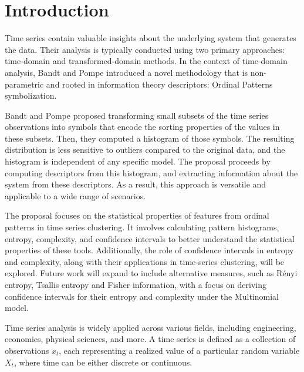 \chapter{Introduction}\label{C:intro}

Time series contain valuable insights about the underlying system that generates the data. 
Their analysis is typically conducted using two primary approaches: time-domain and transformed-domain methods. 
In the context of time-domain analysis, Bandt and Pompe \cite{PhysRevLett.88.174102} introduced a novel methodology that is non-parametric and rooted in information theory descriptors: Ordinal Patterns symbolization. 

Bandt and Pompe \cite{PhysRevLett.88.174102} proposed transforming small subsets of the time series observations into symbols that encode the sorting properties of the values in these subsets.
Then, they computed a histogram of those symbols.
The resulting distribution is less sensitive to outliers compared to the original data, and the histogram is independent of any specific model.
The proposal proceeds by computing descriptors from this histogram, and extracting information about the system from these descriptors.
As a result, this approach is versatile and applicable to a wide range of scenarios.  

The proposal focuses on the statistical properties of features from ordinal patterns in time series clustering. It involves calculating pattern histograms, entropy, complexity, and confidence intervals to better understand the statistical properties of these tools. 
Additionally, the role of confidence intervals in entropy and complexity, along with their applications in time-series clustering, will be explored. Future work will expand to include alternative measures, such as Rényi entropy, Tsallis entropy and Fisher information, with a focus on deriving confidence intervals for their entropy and complexity under the Multinomial model. 

Time series analysis is widely applied across various fields, including engineering, economics, physical sciences, and more. A time series is defined as a collection of observations ${x_t}$, each representing a realized value of a particular random variable $X_t$, where time can be either discrete or continuous.

